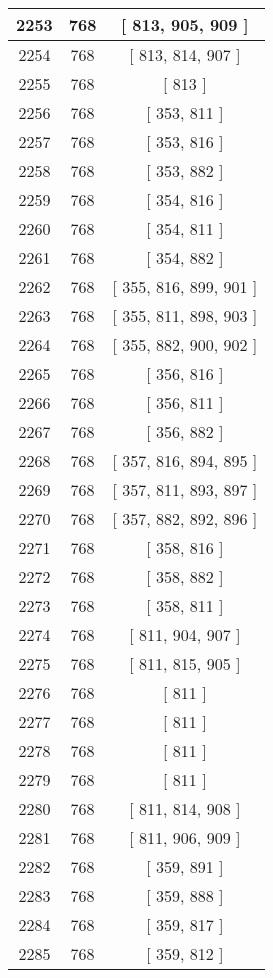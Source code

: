 \begin{center}
\begin{longtable}[H]{|| c c c ||}
\hline
2253 & 768 & [ 813, 905, 909 ] \\ 
\hline
2254 & 768 & [ 813, 814, 907 ] \\ 
\hline
2255 & 768 & [ 813 ] \\ 
\hline
2256 & 768 & [ 353, 811 ] \\ 
\hline
2257 & 768 & [ 353, 816 ] \\ 
\hline
2258 & 768 & [ 353, 882 ] \\ 
\hline
2259 & 768 & [ 354, 816 ] \\ 
\hline
2260 & 768 & [ 354, 811 ] \\ 
\hline
2261 & 768 & [ 354, 882 ] \\ 
\hline
2262 & 768 & [ 355, 816, 899, 901 ] \\ 
\hline
2263 & 768 & [ 355, 811, 898, 903 ] \\ 
\hline
2264 & 768 & [ 355, 882, 900, 902 ] \\ 
\hline
2265 & 768 & [ 356, 816 ] \\ 
\hline
2266 & 768 & [ 356, 811 ] \\ 
\hline
2267 & 768 & [ 356, 882 ] \\ 
\hline
2268 & 768 & [ 357, 816, 894, 895 ] \\ 
\hline
2269 & 768 & [ 357, 811, 893, 897 ] \\ 
\hline
2270 & 768 & [ 357, 882, 892, 896 ] \\ 
\hline
2271 & 768 & [ 358, 816 ] \\ 
\hline
2272 & 768 & [ 358, 882 ] \\ 
\hline
2273 & 768 & [ 358, 811 ] \\ 
\hline
2274 & 768 & [ 811, 904, 907 ] \\ 
\hline
2275 & 768 & [ 811, 815, 905 ] \\ 
\hline
2276 & 768 & [ 811 ] \\ 
\hline
2277 & 768 & [ 811 ] \\ 
\hline
2278 & 768 & [ 811 ] \\ 
\hline
2279 & 768 & [ 811 ] \\ 
\hline
2280 & 768 & [ 811, 814, 908 ] \\ 
\hline
2281 & 768 & [ 811, 906, 909 ] \\ 
\hline
2282 & 768 & [ 359, 891 ] \\ 
\hline
2283 & 768 & [ 359, 888 ] \\ 
\hline
2284 & 768 & [ 359, 817 ] \\ 
\hline
2285 & 768 & [ 359, 812 ] \\ 

\end{longtable}
\end{center}
